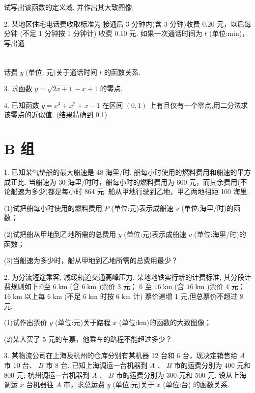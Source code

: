 \documentclass[10pt]{article}
\begin{document}
试写出该函数的定义域, 并作出其大致图像.

2. 某地区住宅电话费收取标准为:接通后 3 分钟内(含 3 分钟)收费 0.20 元，以后每分钟 (不足 1 分钟按 1 分钟计) 收费 0.10 元. 如果一次通话时间为 \(t\) (单位:min)，写出通



\section*{}

话费 \(y\) (单位: 元)关于通话时间 \(t\) 的函数关系.

3. 求函数 \(y = \sqrt{{2x} + 1} - x + 1\) 的零点.

4. 已知函数 \(y = {x}^{3} + {x}^{2} + x - 1\) 在区间 \(\left( {0,1}\right)\) 上有且仅有一个零点,用二分法求该零点的近似值. (结果精确到 0.1)

\section*{B 组}

1. 已知某气垫船的最大船速是 48 海里/时, 船每小时使用的燃料费用和船速的平方成正比. 当船速为 30 海里/时时，船每小时的燃料费用为 600 元，而其余费用(不论船速为多少)都是每小时 864 元. 船从甲地行驶到乙地，甲乙两地相距 100 海里.

(1)试把船每小时使用的燃料费用 \(P\) (单位:元)表示成船速 \(v\) (单位:海里/时)的函数；

(2)试把船从甲地到乙地所需的总费用 \(y\) (单位:元)表示成船速 \(v\) (单位:海里/时)的函数；

(3)当船速为多少时，船从甲地到乙地所需的总费用最少？

2. 为分流短途乘客, 减缓轨道交通高峰压力, 某地地铁实行新的计费标准, 其分段计费规则如下:0至 \(6\mathrm{\;{km}}\) (含 \(6\mathrm{\;{km}}\) )票价 3 元； 6 至 \({16}\mathrm{\;{km}}\) (含 \({16}\mathrm{\;{km}}\) )票价 4 元； \({16}\mathrm{\;{km}}\) 以上每 \(6\mathrm{\;{km}}\) (不足 \(6\mathrm{\;{km}}\) 时按 \(6\mathrm{\;{km}}\) 计) 票价递增 1 元,但总票价不超过 8 元.

(1)试作出票价 \(y\) (单位:元)关于路程 \(x\) (单位:km)的函数的大致图像；

(2)某人买了 5 元的车票，他乘车的路程不能超过多少？

3. 某物流公司在上海及杭州的仓库分别有某机器 12 台和 6 台，现决定销售给 \(A\) 市 10 台、 \(B\) 市 8 台. 已知上海调运一台机器到 \(A\) 、 \(B\) 市的运费分别为 400 元和 800 元; 杭州调运一台机器到 \(A\text{ 、 }B\) 市的运费分别为 300 元和 500 元. 设从上海调运 \(x\) 台机器往 \(A\) 市，求总运费 \(y\) (单位:元)关于 \(x\) (单位:台) 的函数关系.
\end{document}
